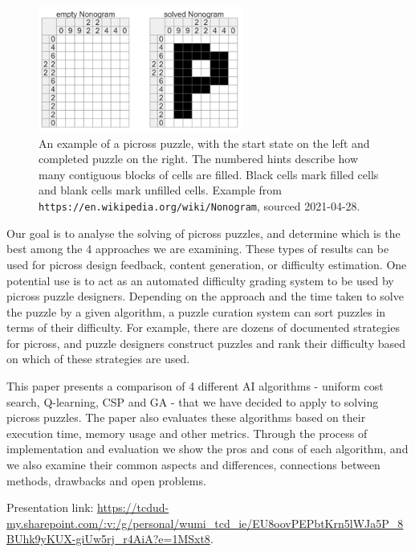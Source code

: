 \documentclass{svproc}
\begin{document}
\begin{figure}[h]
  \centering
  \includegraphics[width=0.6\textwidth]{picross1.png}
  \caption{An example of a picross puzzle, with the start state on the left and completed puzzle on the right. The numbered hints describe how many contiguous blocks of cells are filled. Black cells mark filled cells and blank cells mark unfilled cells. Example from \texttt{https://en.wikipedia.org/wiki/Nonogram}, sourced 2021-04-28.}
\end{figure}

Our goal is to analyse the solving of picross puzzles, and determine which is the best among the 4 approaches we are examining. These types of results can be used for picross design feedback, content generation, or difficulty estimation.
One potential use is to act as an automated difficulty grading system to be used by picross puzzle designers. Depending on the approach and the time taken to solve the puzzle by a given algorithm, a puzzle curation system can sort puzzles in terms of their difficulty.
For example, there are dozens of documented strategies for picross\cite{picross1}, and puzzle designers construct puzzles and rank their difficulty based on which of these strategies are used\cite{picross2}.

This paper presents a comparison of 4 different AI algorithms - uniform cost search, Q-learning, CSP and GA - that we  have decided to apply to solving picross puzzles.
The paper also evaluates these algorithms based on their execution time, memory usage and other metrics.
Through the process of implementation and evaluation we show the pros and cons of each algorithm, and we also examine their common aspects and differences, connections between methods, drawbacks and open problems.


{\small Presentation link: \url{https://tcdud-my.sharepoint.com/:v:/g/personal/wumi_tcd_ie/EU8oovPEPbtKrn5lWJa5P_8BUhk9yKUX-giUw5rj_r4AiA?e=1MSxt8}.}
\end{document}
